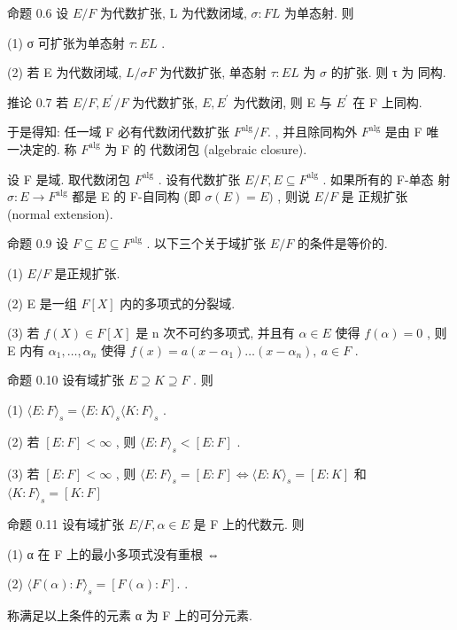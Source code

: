 \documentclass[]{article}
\begin{document}
命题 0.6 设 $E / F$ 为代数扩张, L 为代数闭域, $\sigma : F  L$ 为单态射. 则 

(1) σ 可扩张为单态射 $\tau : E  L$ . 

(2) 若 E 为代数闭域, $L / \sigma F$ 为代数扩张, 单态射 $\tau : E  L$ 为 $\sigma$ 的扩张. 则 τ 为 同构. 

推论 0.7 若 $E / F , E ^ { \prime } / F$ 为代数扩张, $E , E ^ { \prime }$ 为代数闭, 则 E 与 $E ^ { \prime }$ 在 F 上同构. 

于是得知: 任一域 F 必有代数闭代数扩张 $F ^ { \mathrm { a l g } } / F .$ , 并且除同构外 $F ^ { \mathrm { a l g } }$ 是由 F 唯 一决定的. 称 $F ^ { \mathrm { a l g } }$ 为 F 的 代数闭包 (algebraic closure). 

设 F 是域. 取代数闭包 $F ^ { \mathrm { a l g } }$ . 设有代数扩张 $E / F , E \subseteq F ^ { \mathrm { a l g } }$ . 如果所有的 F-单态 射 $\sigma : E \to F ^ { \mathrm { a l g } }$ 都是 E 的 F-自同构 (即 $\sigma ( E ) = E )$ , 则说 $E / F$ 是 正规扩张 (normal extension). 

命题 0.9 设 $F \subseteq E \subseteq F ^ { \mathrm { a l g } }$ . 以下三个关于域扩张 $E / F$ 的条件是等价的. 

(1) $E / F$ 是正规扩张. 

(2) E 是一组 $F [ X ]$ 内的多项式的分裂域. 

(3) 若 $f ( X ) \in F [ X ]$ 是 n 次不可约多项式, 并且有 $\alpha \in E$ 使得 $f ( \alpha ) = 0$ , 则 E 内有 $\alpha _ { 1 } , \ldots , \alpha _ { n }$ 使得 $f ( x ) = a ( x - \alpha _ { 1 } ) \dots ( x - \alpha _ { n } ) , \ a \in F$ . 

命题 0.10 设有域扩张 $E \supseteq K \supseteq F$ . 则 

(1) $\langle E : F \rangle _ { s } = \langle E : K \rangle _ { s } \langle K : F \rangle _ { s }$ . 

(2) 若 $[ E : F ] < \infty$ , 则 $\langle E : F \rangle _ { s } < [ E : F ]$ . 

(3) 若 $[ E : F ] < \infty$ , 则 $\langle E : F \rangle _ { s } = [ E : F ] \Leftrightarrow \langle E : K \rangle _ { s } = [ E : K ]$ 和 $\langle K : F \rangle _ { s } = [ K : F ]$ 

命题 0.11 设有域扩张 $E / F , \alpha \in E$ 是 F 上的代数元. 则 

(1) α 在 F 上的最小多项式没有重根 ⇔ 

(2) $\langle F ( \alpha ) : F \rangle _ { s } = [ F ( \alpha ) : F ] \mathrm { . }$ . 

称满足以上条件的元素 α 为 F 上的可分元素. 
\end{document}
